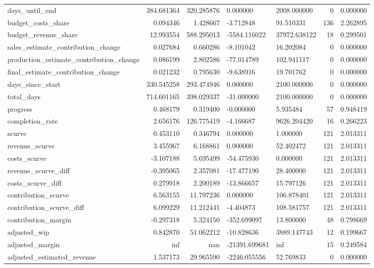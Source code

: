\begin{landscape}
\begin{longtable}[h!]{lrrllrr}
days_until_end & 384.681364 & 320.285876 & 0.000000 & 2008.000000 & 0 & 0.000000 \\
budget_costs_share & 0.094346 & 1.428667 & -3.712848 & 91.510331 & 136 & 2.262895 \\
budget_revenue_share & 12.993554 & 588.295013 & -5584.116022 & 37972.638122 & 18 & 0.299501 \\
sales_estimate_contribution_change & 0.027684 & 0.660286 & -8.101042 & 16.202084 & 0 & 0.000000 \\
production_estimate_contribution_change & 0.086199 & 2.802586 & -77.014789 & 102.941117 & 0 & 0.000000 \\
final_estimate_contribution_change & 0.021232 & 0.795630 & -9.638916 & 19.701762 & 0 & 0.000000 \\
days_since_start & 330.545258 & 293.474946 & 0.000000 & 2100.000000 & 0 & 0.000000 \\
total_days & 714.601165 & 398.029337 & -31.000000 & 2100.000000 & 0 & 0.000000 \\
progress & 0.468179 & 0.319400 & -0.000000 & 5.935484 & 57 & 0.948419 \\
completion_rate & 2.656176 & 126.775419 & -4.166687 & 9626.204420 & 16 & 0.266223 \\
scurve & 0.453110 & 0.346794 & 0.000000 & 1.000000 & 121 & 2.013311 \\
revenue_scurve & 3.455967 & 6.168861 & 0.000000 & 52.402472 & 121 & 2.013311 \\
costs_scurve & -3.107188 & 5.695499 & -54.475930 & 0.000000 & 121 & 2.013311 \\
revenue_scurve_diff & -0.395065 & 2.357081 & -17.477190 & 28.400000 & 121 & 2.013311 \\
costs_scurve_diff & 0.279918 & 2.200189 & -13.866657 & 15.797126 & 121 & 2.013311 \\
contribution_scurve & 6.563155 & 11.797236 & 0.000000 & 106.878401 & 121 & 2.013311 \\
contribution_scurve_diff & 6.099229 & 11.212441 & -4.404873 & 108.581757 & 121 & 2.013311 \\
contribution_margin & -0.297318 & 5.324150 & -352.699097 & 13.800000 & 48 & 0.798669 \\
adjusted_wip & 0.842870 & 51.062212 & -10.828636 & 3889.147743 & 12 & 0.199667 \\
adjusted_margin & inf & nan & -21391.699681 & inf & 15 & 0.249584 \\
adjusted_estimated_revenue & 1.537173 & 29.965590 & -2246.055556 & 52.769833 & 0 & 0.000000 \\

\end{longtable}
\end{landscape}
